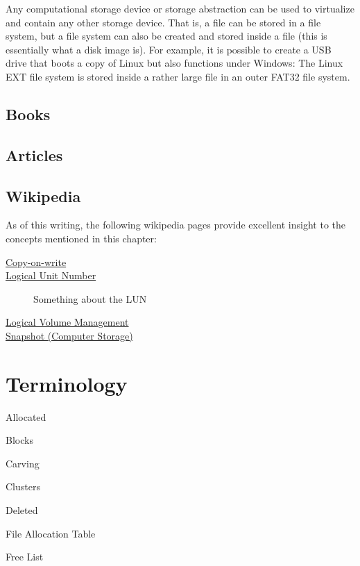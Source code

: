 Any computational storage device or storage abstraction can be used to
virtualize and contain any other storage device. That is, a file can
be stored in a file system, but a file system can also be created and
stored inside a file (this is essentially what a disk image is). For
example, it is possible to create a USB drive that boots a copy of
Linux but also functions under Windows: The Linux EXT file system is
stored inside a rather large file in an outer FAT32 file system.

\subsection{Books}
\subsection{Articles}
\subsection{Wikipedia}
As of this writing, the following wikipedia pages provide excellent
insight to the concepts mentioned in this chapter:

\begin{description}
\item[\href{http://en.wikipedia.org/wiki/Copy-on-write}{Copy-on-write}]
\item[\href{http://en.wikipedia.org/wiki/Logical_Unit_Number}{Logical
    Unit Number}] Something about the LUN
\item[\href{http://en.wikipedia.org/wiki/Logical_volume_management}{Logical
    Volume Management}]
\item[\href{http://en.wikipedia.org/wiki/Snapshot_(computer_storage)}{Snapshot
    (Computer Storage)}]
\end{description}

\section{Terminology}


Allocated

Blocks

Carving

Clusters

Deleted

File Allocation Table

Free List

